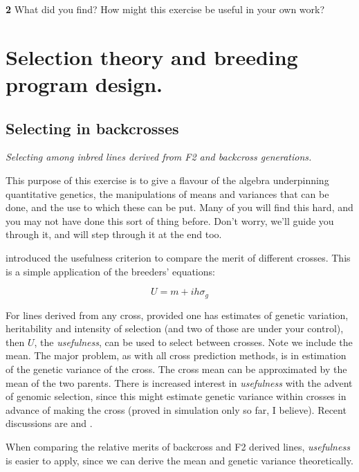 \documentclass[
]{book}
\makeatletter
\newenvironment{kframe}{%
\medskip{}
\setlength{\fboxsep}{.8em}
 \def\at@end@of@kframe{}%
 \ifinner\ifhmode%
  \def\at@end@of@kframe{\end{minipage}}%
  \begin{minipage}{\columnwidth}%
 \fi\fi%
 \def\FrameCommand##1{\hskip\@totalleftmargin \hskip-\fboxsep
 \colorbox{shadecolor}{##1}\hskip-\fboxsep
     \hskip-\linewidth \hskip-\@totalleftmargin \hskip\columnwidth}%
 \MakeFramed {\advance\hsize-\width
   \@totalleftmargin\z@ \linewidth\hsize
   \@setminipage}}%
 {\par\unskip\endMakeFramed%
 \at@end@of@kframe}
\newenvironment{rmdblock}[1]
  {
  \begin{itemize}
  \renewcommand{\labelitemi}{
    \raisebox{-.7\height}[0pt][0pt]{
      {\setkeys{Gin}{width=3em,keepaspectratio}\texttt{[image: images/\#1]}}
    }
  }
  \setlength{\fboxsep}{1em}
  \begin{kframe}
  \item
  }
  {
  \end{kframe}
  \end{itemize}
  }
\newenvironment{rmdquiz}
  {\begin{rmdblock}{quiz}}
  {\end{rmdblock}}
\makeatother
\begin{document}
\begin{rmdquiz}
\textbf{2}
What did you find? How might this exercise be useful in your own work?
\end{rmdquiz}

\hypertarget{selection-theory}{%
\chapter{Selection theory and breeding program design.}\label{selection-theory}}

\hypertarget{selecting-in-backcrosses}{%
\section{Selecting in backcrosses}\label{selecting-in-backcrosses}}

\emph{Selecting among inbred lines derived from F2 and backcross generations.}

This purpose of this exercise is to give a flavour of the algebra underpinning quantitative genetics, the manipulations of means and variances that can be done, and the use to which these can be put. Many of you will find this hard, and you may not have done this sort of thing before. Don't worry, we'll guide you through it, and will step through it at the end too.

\citet{Schnell_1975} introduced the usefulness criterion to compare the merit of different crosses. This is a simple application of the breeders' equations:

\[U  = m + ihσ_{g}\]

For lines derived from any cross, provided one has estimates of genetic variation, heritability and intensity of selection (and two of those are under your control), then \(U\), the \emph{usefulness}, can be used to select between crosses. Note we include the mean. The major problem, as with all cross prediction methods, is in estimation of the genetic variance of the cross. The cross mean can be approximated by the mean of the two parents. There is increased interest in \emph{usefulness} with the advent of genomic selection, since this might estimate genetic variance within crosses in advance of making the cross (proved in simulation only so far, I believe). Recent discussions are \citet{bernardo_genomewide_2014} and \citet{allier_usefulness_2019}.

When comparing the relative merits of backcross and F2 derived lines, \emph{usefulness} is easier to apply, since we can derive the mean and genetic variance theoretically.
\end{document}
